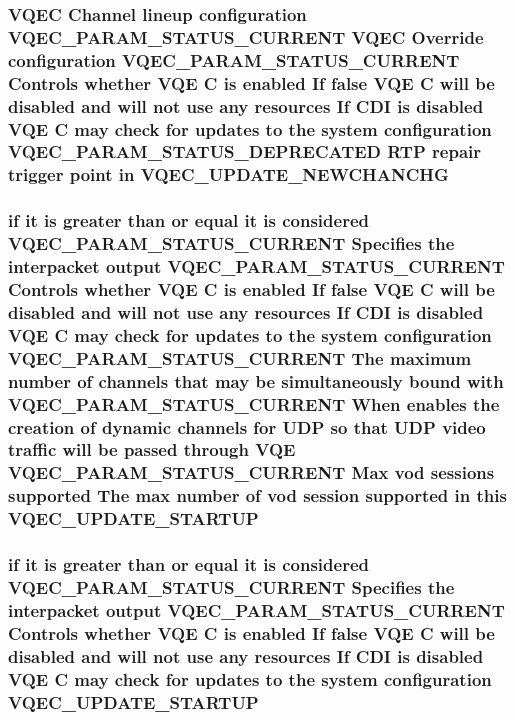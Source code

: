 \subsubsection{\setlength{\rightskip}{0pt plus 5cm}VQEC Channel lineup configuration VQEC\_\-PARAM\_\-STATUS\_\-CURRENT VQEC Override configuration VQEC\_\-PARAM\_\-STATUS\_\-CURRENT Controls whether VQE \bf{C} is enabled If false VQE \bf{C} will be disabled and will not use any resources If CDI is disabled VQE \bf{C} may check for updates \bf{to} the system configuration VQEC\_\-PARAM\_\-STATUS\_\-DEPRECATED RTP repair trigger point in \bf{VQEC\_\-UPDATE\_\-NEWCHANCHG}}\label{vqec__cfg__settings_8h_55a124ff7cf04dc93bf877a88076ee0a}


\subsubsection{\setlength{\rightskip}{0pt plus 5cm}if it is greater than or equal it is considered VQEC\_\-PARAM\_\-STATUS\_\-CURRENT Specifies the interpacket output VQEC\_\-PARAM\_\-STATUS\_\-CURRENT Controls whether VQE \bf{C} is enabled If false VQE \bf{C} will be disabled and will not use any resources If CDI is disabled VQE \bf{C} may check for updates \bf{to} the system configuration VQEC\_\-PARAM\_\-STATUS\_\-CURRENT The maximum number of \bf{channels} that may be simultaneously bound with VQEC\_\-PARAM\_\-STATUS\_\-CURRENT When enables the creation of dynamic \bf{channels} for UDP so that UDP video traffic will be passed through VQE VQEC\_\-PARAM\_\-STATUS\_\-CURRENT Max vod sessions supported The max number of vod session supported in \bf{this} \bf{VQEC\_\-UPDATE\_\-STARTUP}}\label{vqec__cfg__settings_8h_a74c6ef31ce94121578a15a1c8be91c3}


\subsubsection{\setlength{\rightskip}{0pt plus 5cm}if it is greater than or equal it is considered VQEC\_\-PARAM\_\-STATUS\_\-CURRENT Specifies the interpacket output VQEC\_\-PARAM\_\-STATUS\_\-CURRENT Controls whether VQE \bf{C} is enabled If false VQE \bf{C} will be disabled and will not use any resources If CDI is disabled VQE \bf{C} may check for updates \bf{to} the system configuration \bf{VQEC\_\-UPDATE\_\-STARTUP}}\label{vqec__cfg__settings_8h_4d3208636e1f43557e0107b9181f382a}


